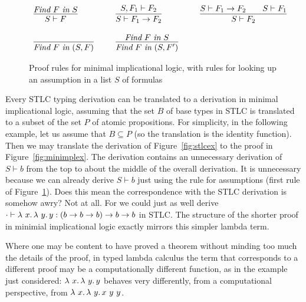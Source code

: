 \begin{figure}
\[
\begin{array}{lllll}
\infer{S \vdash F}{\textit{Find}\ F\ \textit{in}\ S}

&\ \ &

\infer{S \vdash F_1 \to F_2}{S , F_1 \vdash F_2}

&\ \ &

\infer{S \vdash F_2}{S \vdash F_1\to F_2 \qquad S \vdash F_1}

\\ \\

\infer{\textit{Find}\ F\ \textit{in}\ (S, F)}{\ }

&\ \ &

\infer{\textit{Find}\ F\ \textit{in}\ (S, F')}{\textit{Find}\ F\ \textit{in}\ S}

&\ \ &

\ 

\end{array}
\]
\caption{Proof rules for minimal implicational logic, with rules for looking up an assumption in a list $S$ of formulas}
\label{fig:minimpl}
\end{figure}

Every STLC typing derivation can be translated to a derivation in
minimal implicational logic, assuming that the set $B$ of base types
in STLC is translated to a subset of the set $P$ of atomic
propositions.  For simplicity, in the following example, let us assume
that $B \subseteq P$ (so the translation is the identity function).
Then we may translate the derivation of Figure~\ref{fig:stlcex} to the
proof in Figure~\ref{fig:minimplex}.  The derivation contains an
unnecessary derivation of $S \vdash b$ from the top to about the
middle of the overall derivation.  It is unnecessary because we can
already derive $S \vdash b$ just using the rule for assumptions (first
rule of Figure~\ref{fig:minimpl}).  Does this mean the correspondence
with the STLC derivation is somehow awry?  Not at all.  For we could
just as well derive $\cdot \vdash \lambda\ x.\, \lambda\ y.\, y : (b \to b \to
b) \to b \to b$ in STLC.  The structure of the shorter proof in
minimial implicational logic exactly mirrors this simpler lambda term.

Where one may be content to have proved a theorem without minding
too much the details of the proof, in typed lambda calculus the term
that corresponds to a different proof may be a computationally different
function, as in the example just considered: $\lambda\ x.\, \lambda\ y.\, y$
behaves very differently, from a computational perspective, from
$\lambda\ x.\, \lambda\ y.\, x\ y\ y$.

